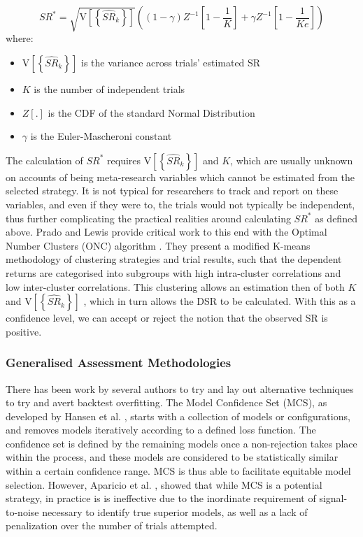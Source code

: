 \documentclass[a4paper,11pt,oneside]{article}
\theoremstyle{plain}
\theoremstyle{definition}
\begin{document}
	\begin{equation}
	SR^{*}=\sqrt{\mathrm{V}\left[\left\{\widehat{S R}_{k}\right\}\right]}\left((1-\gamma) Z^{-1}\left[1-\frac{1}{K}\right]+\gamma Z^{-1}\left[1-\frac{1}{K e}\right]\right)
	\end{equation}
	where:
	\begin{itemize}
		\item [] $\mathrm{V}\left[\left\{\widehat{S R}_{k}\right\}\right]$ is the variance across trials' estimated SR
		\item [] $K$ is the number of independent trials
		\item [] $Z[.]$ is the CDF of the standard Normal Distribution 
		\item [] $\gamma$ is the Euler-Mascheroni constant
	\end{itemize}
	
	The calculation of $SR^{*}$ requires $\mathrm{V}\left[\left\{\widehat{S R}_{k}\right\}\right]$ and  $K$, which are usually unknown on accounts of being meta-research variables which cannot be estimated from the selected strategy. It is not typical for researchers to track and report on these variables, and even if they were to, the trials would not typically be independent, thus further complicating the practical realities around calculating $SR^{*}$ as defined above. Prado and Lewis provide critical work to this end with the Optimal Number Clusters (ONC) algorithm \cite{PradoDSR}. They present a modified K-means methodology of clustering strategies and trial results, such that the dependent returns are categorised into subgroups with high intra-cluster correlations and low inter-cluster correlations. This clustering allows an estimation then of both  $K$ and $\mathrm{V}\left[\left\{\widehat{S R}_{k}\right\}\right]$ , which in turn allows the DSR to be calculated. With this as a confidence level, we can accept or reject the notion that the observed SR is positive.
	
	\hfill \break
	
	\subsubsection{Generalised Assessment Methodologies}\label{lr_backtest_cscv}
	
	There has been work by several authors to try and lay out alternative techniques to try and avert backtest overfitting. 
	The Model Confidence Set (MCS), as developed by Hansen et al. \cite{Hansen}, starts with a 
	collection of models or configurations, and removes models iteratively according to a defined loss function. 
	The confidence set is defined by the remaining models once a non-rejection takes place within the process, and 
	these models are considered to be statistically similar within a certain confidence range. MCS is thus able to facilitate 
	equitable model selection. However, Aparicio et al. \cite{Aparicio}, showed  that while MCS is a potential strategy, in 
	practice is is ineffective due to the inordinate requirement of signal-to-noise necessary to identify true superior 
	models, as well as a lack of penalization over the number of trials attempted.
	\hfill \break
	
\end{document}
